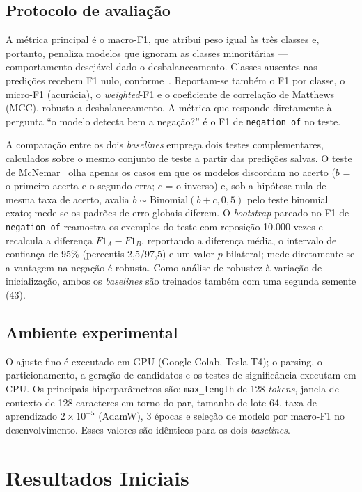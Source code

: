 \documentclass[12pt]{article}
\begin{document}
\subsection{Protocolo de avaliação}
A métrica principal é o macro-F1, que atribui peso igual às três classes e,
portanto, penaliza modelos que ignoram as classes minoritárias --- comportamento
desejável dado o desbalanceamento. Classes ausentes nas predições recebem F1
nulo, conforme~\cite{forman:10}. Reportam-se também o F1 por classe, o micro-F1
(acurácia), o \emph{weighted}-F1 e o coeficiente de correlação de Matthews
(MCC), robusto a desbalanceamento. A métrica que responde diretamente à pergunta
``o modelo detecta bem a negação?'' é o F1 de \texttt{negation\_of} no teste.

A comparação entre os dois \emph{baselines} emprega dois testes complementares,
calculados sobre o mesmo conjunto de teste a partir das predições salvas. O teste
de McNemar~\cite{dietterich:98} olha apenas os casos em que os modelos discordam
no acerto ($b$ = o primeiro acerta e o segundo erra; $c$ = o inverso) e, sob a
hipótese nula de mesma taxa de acerto, avalia $b \sim \mathrm{Binomial}(b+c,
0{,}5)$ pelo teste binomial exato; mede se os padrões de erro globais diferem.
O \emph{bootstrap} pareado no F1 de \texttt{negation\_of} reamostra os exemplos
do teste com reposição 10.000 vezes e recalcula a diferença $F1_A - F1_B$,
reportando a diferença média, o intervalo de confiança de 95\% (percentis
2,5/97,5) e um valor-$p$ bilateral; mede diretamente se a vantagem na negação é
robusta. Como análise de robustez à variação de inicialização, ambos os
\emph{baselines} são treinados também com uma segunda semente (43).

\subsection{Ambiente experimental}
O ajuste fino é executado em GPU (Google Colab, Tesla T4); o parsing, o
particionamento, a geração de candidatos e os testes de significância executam em
CPU. Os principais hiperparâmetros são: \texttt{max\_length} de 128
\emph{tokens}, janela de contexto de 128 caracteres em torno do par, tamanho de
lote 64, taxa de aprendizado $2\times10^{-5}$ (AdamW), 3 épocas e seleção de
modelo por macro-F1 no desenvolvimento. Esses valores são idênticos para os dois
\emph{baselines}.

\section{Resultados Iniciais}\label{sec:res}
\end{document}
